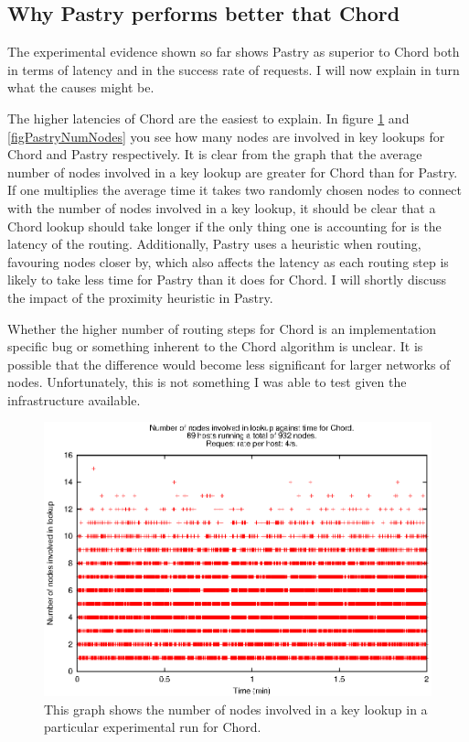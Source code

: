 \subsection{Why Pastry performs better that Chord}
The experimental evidence shown so far shows Pastry as superior to Chord both in terms of latency and in the success rate of requests. I will now explain in turn what the causes might be.

\mbox{}

The higher latencies of Chord are the easiest to explain. In figure \ref{figChordNumNodes} and \ref{figPastryNumNodes} you see how many nodes are involved in key lookups for Chord and Pastry respectively. It is clear from the graph that the average number of nodes involved in a key lookup are greater for Chord than for Pastry. If one multiplies the average time it takes two randomly chosen nodes to connect with the number of nodes involved in a key lookup, it should be clear that a Chord lookup should take longer if the only thing one is accounting for is the latency of the routing. Additionally, Pastry uses a heuristic when routing, favouring nodes closer by, which also affects the latency as each routing step is likely to take less time for Pastry than it does for Chord. I will shortly discuss the impact of the proximity heuristic in Pastry.

Whether the higher number of routing steps for Chord is an implementation specific bug or something inherent to the Chord algorithm is unclear. It is possible that the difference would become less significant for larger networks of nodes. Unfortunately, this is not something I was able to test given the infrastructure available.

\begin{figure}[!htbp]
  \begin{center}
    \includegraphics[width=0.9\linewidth]{illustrations/nodes_against_time_chord.eps}
    \caption{This graph shows the number of nodes involved in a key lookup in a particular experimental run for Chord.}
    \label{figChordNumNodes}
  \end{center}
\end{figure}

